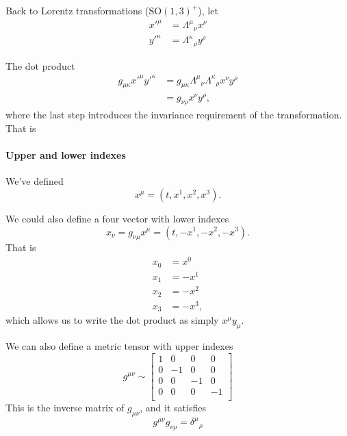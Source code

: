 Back to Lorentz transformations (\(\text{SO}(1,3)^+\)), let
\begin{equation}\label{eqn:qftLecture2:600}
\begin{aligned}
{x'}^\mu    &= {\Lambda^\mu}_\nu x^\nu \\
{y'}^\kappa &= {\Lambda^\kappa}_\rho y^\rho
\end{aligned}
\end{equation}

The dot product
\begin{equation}\label{eqn:qftLecture2:620}
\begin{aligned}
g_{\mu \kappa}
{x'}^\mu
{y'}^\kappa
&=
g_{\mu \kappa}
{\Lambda^\mu}_\nu
{\Lambda^\kappa}_\rho
x^\nu
y^\rho \\
&=
g_{\nu\rho}
x^\nu
y^\rho,
\end{aligned}
\end{equation}
where the last step introduces the invariance requirement of the transformation.  That is
\paragraph{Upper and lower indexes}
We've defined
\begin{equation}\label{eqn:qftLecture2:660}
x^\mu = (t, x^1, x^2, x^3).
\end{equation}

We could also define a four vector with lower indexes
\begin{equation}\label{eqn:qftLecture2:680}
x_\nu = g_{\nu\mu} x^\mu = (t, -x^1, -x^2, -x^3).
\end{equation}
That is
\begin{equation}\label{eqn:qftLecture2:700}
\begin{aligned}
x_0 &= x^0 \\
x_1 &= -x^1 \\
x_2 &= -x^2 \\
x_3 &= -x^3,
\end{aligned}
\end{equation}
which allows us to write the dot product as simply \( x^\mu y_\mu \).

We can also define a metric tensor with upper indexes
\begin{equation}\label{eqn:qftLecture2:401}
g^{\mu\nu} \sim
\begin{bmatrix}
1 & 0 & 0 & 0 \\
0 & -1 & 0 & 0 \\
0 & 0 & -1 & 0 \\
0 & 0 & 0 & -1 \\
\end{bmatrix}
\end{equation}
This is the inverse matrix of \( g_{\mu\nu} \), and it satisfies
\begin{equation}\label{eqn:qftLecture2:720}
g^{\mu \nu} g_{\nu\rho} = {\delta^\mu}_\rho
\end{equation}

